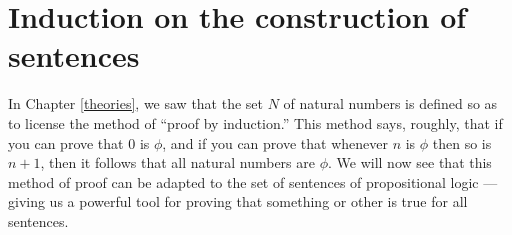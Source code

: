 \section{Induction on the construction of sentences}

In Chapter \ref{theories}, we saw that the set $N$ of natural numbers
is defined so as to license the method of ``proof by induction.''
This method says, roughly, that if you can prove that $0$ is $\phi$,
and if you can prove that whenever $n$ is $\phi$ then so is $n+1$,
then it follows that all natural numbers are $\phi$.  We will now see
that this method of proof can be adapted to the set of sentences of
propositional logic --- giving us a powerful tool for proving that
something or other is true for all sentences.




